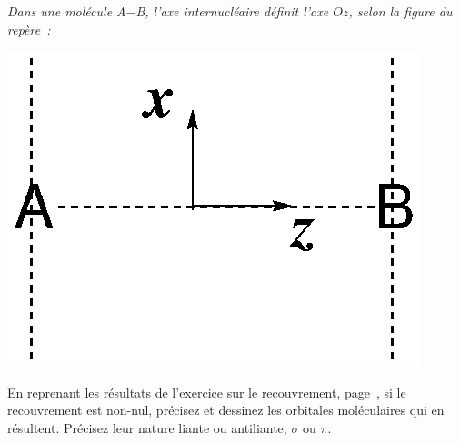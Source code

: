 
\parbox{0.5\textwidth}{\textit{Dans une mol\'ecule A$-$B, l'axe internucl\'eaire 
d\'efinit l'axe $Oz$, selon la figure du rep\`ere~:}}
\parbox{0.5\textwidth}{\centerline{\includegraphics[scale=0.4]{figure/AB_repere.eps}}}

En reprenant les r\'esultats de l'exercice sur le recouvrement, page~\pageref{exo_s}, 
si le recouvrement est non-nul, pr\'ecisez et dessinez les
orbitales mol\'eculaires qui en r\'esultent. Pr\'ecisez leur nature
liante ou antiliante, $\sigma$ ou $\pi$.

\vspace{0.3cm}

